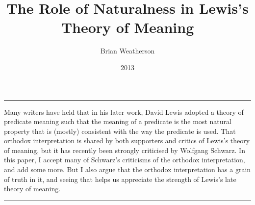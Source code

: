 \documentclass[
  10pt,
  letterpaper,
  DIV=11,
  numbers=noendperiod,
  twoside]{scrartcl}
\title{The Role of Naturalness in Lewis's Theory of Meaning}
\author{Brian Weatherson}
\date{2013}
\renewenvironment{abstract}
 {\vspace{-1.25cm}
 \quotation\small\noindent\rule{\linewidth}{.5pt}\par\smallskip
 \noindent }
 {\par\noindent\rule{\linewidth}{.5pt}\endquotation}
\begin{document}
\maketitle
\begin{abstract}
Many writers have held that in his later work, David Lewis adopted a
theory of predicate meaning such that the meaning of a predicate is the
most natural property that is (mostly) consistent with the way the
predicate is used. That orthodox interpretation is shared by both
supporters and critics of Lewis's theory of meaning, but it has recently
been strongly criticised by Wolfgang Schwarz. In this paper, I accept
many of Schwarz's criticisms of the orthodox interpretation, and add
some more. But I also argue that the orthodox interpretation has a grain
of truth in it, and seeing that helps us appreciate the strength of
Lewis's late theory of meaning.
\end{abstract}
\end{document}
